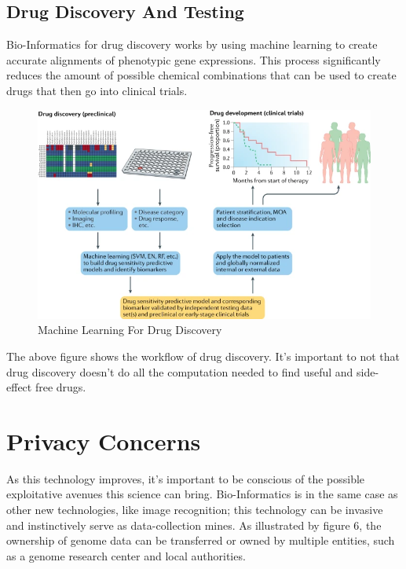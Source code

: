 \documentclass[12pt,journal,compsoc]{IEEEtran}
\begin{document}
\subsection{Drug Discovery And Testing}
Bio-Informatics for drug discovery works by using machine learning to create accurate alignments of phenotypic gene expressions. This process significantly reduces the amount of possible chemical combinations that can be used to create drugs that then go into clinical trials. 
\begin{figure}[H]
    \centering
    \includegraphics[width=\linewidth]{images/Screenshot 2022-06-07 at 23-54-30 Applications of machine learning in drug discovery and development - Nature Reviews Drug Discovery.png}
    \caption{Machine Learning For Drug Discovery}
    \label{fig: Machine Learning For Drug Discovery}
\end{figure}
The above figure shows the workflow of drug discovery. It's important to not that drug discovery doesn't do all the computation needed to find useful and side-effect free drugs. 
\section{Privacy Concerns}
As this technology improves, it's important to be conscious of the possible exploitative avenues this science can bring. Bio-Informatics is in the same case as other new technologies, like image recognition; this technology can be invasive and instinctively serve as data-collection mines. As illustrated by figure 6, the ownership of genome data can be transferred or owned by multiple entities, such as a genome research center and local authorities.
\end{document}
